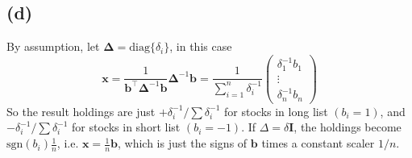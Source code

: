 \documentclass[11pt]{article}
\begin{document}
\subsection{(d)} 
By assumption, let $\bm{\Delta} = \text{diag}\{\delta_i\}$, in this case
\begin{equation}
  \bm{x} = \frac{1}{\bm{b}^{\top}\bm{\Delta}^{-1} \bm{b}} \bm{\Delta}^{-1}\bm{b} = \frac{1}{\sum_{i=1}^n \delta_i^{-1}} \begin{pmatrix}
    \delta_1^{-1} b_1\\
    \vdots \\
    \delta_n^{-1} b_n
  \end{pmatrix}
\end{equation}
So the result holdings are just $+\delta_i^{-1}/\sum \delta_i^{-1}$ for stocks in long list $(b_i = 1)$, and $-\delta_i^{-1}/\sum \delta_i^{-1}$ for stocks in short list $(b_i = -1)$. If $\Delta = \delta \bm{I}$, the holdings become $\text{sgn}(b_i) \frac{1}{n}$, i.e. $\bm{x} = \frac{1}{n} \bm{b}$, which is just the signs of $\bm{b}$ times a constant scaler $1/n$.

    
    
    
    
\end{document}
